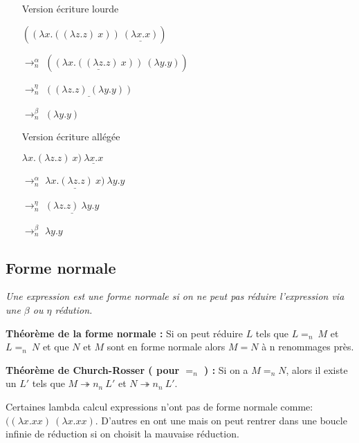 \documentclass[10pt,a4paper]{report}
\begin{document}
\begin{multicols}{2}{
    \begin{itemize}
    \item[] Version écriture lourde
    \item[] $((\lambda x.((\lambda z.z)~x))~\underline{(\lambda x.x)})$
    \item[$\rightarrow_{n}^{\alpha}$] $(\underline{(\lambda x.((\lambda z.z)~x))}~(\lambda y.y))$
    \item[$\rightarrow_{n}^{\eta}$] $\underline{((\lambda z.z)~(\lambda y.y))}$
    \item[$\rightarrow_{n}^{\beta}$] $(\lambda y.y)$
    \end{itemize}
    
    \begin{itemize}
    \item[] Version écriture allégée
    \item[] $\lambda x.(\lambda z.z)~x)~\underline{\lambda x.x}$
    \item[$\rightarrow_{n}^{\alpha}$] $\underline{\lambda x.(\lambda z.z)~x)}~\lambda y.y$
    \item[$\rightarrow_{n}^{\eta}$] $\underline{(\lambda z.z)~\lambda y.y}$
    \item[$\rightarrow_{n}^{\beta}$] $\lambda y.y$
    \end{itemize}
  }
\end{multicols}
\bigbreak


\subsection{Forme normale}

\textit{Une expression est une forme normale si on ne peut pas réduire l'expression via une $\beta$ ou $\eta$ rédution.}
\medbreak

\textbf{Théorème de la forme normale :}
Si on peut réduire $L$ tels que $L =_{n}~M$ et $L =_{n}~N$ et que $N$ et $M$ sont en forme normale alors $M = N$ à n renommages près.
\medbreak	

\textbf{Théorème de Church-Rosser ( pour $=_{n}$ ) :}
Si on a $M =_{n} N$, alors il existe un $L'$ tels que $M \twoheadrightarrow n_{n}~L'$ et $N \twoheadrightarrow n_{n}~L'$.
\medbreak

Certaines lambda calcul expressions n'ont pas de forme normale comme: $((\lambda x.x x)~(\lambda x.x x)$. 
D'autres en ont une mais on peut rentrer dans une boucle infinie de réduction si on choisit la mauvaise réduction.
\medbreak
\end{document}
